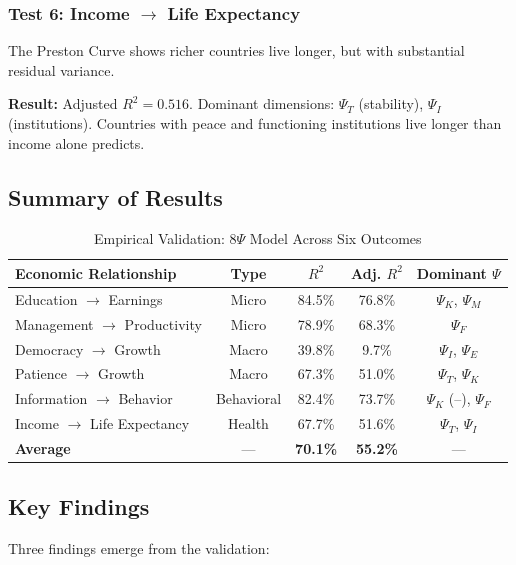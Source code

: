 \subsubsection{Test 6: Income $\rightarrow$ Life Expectancy}

The Preston Curve shows richer countries live longer, but with substantial residual variance.

\textbf{Result:} Adjusted $R^2 = 0.516$. Dominant dimensions: $\Psi_T$ (stability), $\Psi_I$ (institutions). Countries with peace and functioning institutions live longer than income alone predicts.

\subsection{Summary of Results}

\begin{table}[htbp]
\centering
\caption{Empirical Validation: 8$\Psi$ Model Across Six Outcomes}
\label{tab:psi-validation-appv}
\small
\begin{tabular}{@{}lcccc@{}}
\toprule
\textbf{Economic Relationship} & \textbf{Type} & \textbf{$R^2$} & \textbf{Adj. $R^2$} & \textbf{Dominant $\Psi$} \\
\midrule
Education $\rightarrow$ Earnings & Micro & 84.5\% & 76.8\% & $\Psi_K$, $\Psi_M$ \\
Management $\rightarrow$ Productivity & Micro & 78.9\% & 68.3\% & $\Psi_F$ \\
Democracy $\rightarrow$ Growth & Macro & 39.8\% & 9.7\% & $\Psi_I$, $\Psi_E$ \\
Patience $\rightarrow$ Growth & Macro & 67.3\% & 51.0\% & $\Psi_T$, $\Psi_K$ \\
Information $\rightarrow$ Behavior & Behavioral & 82.4\% & 73.7\% & $\Psi_K$ (--), $\Psi_F$ \\
Income $\rightarrow$ Life Expectancy & Health & 67.7\% & 51.6\% & $\Psi_T$, $\Psi_I$ \\
\midrule
\textbf{Average} & --- & \textbf{70.1\%} & \textbf{55.2\%} & --- \\
\bottomrule
\end{tabular}
\end{table}

\subsection{Key Findings}

Three findings emerge from the validation:

